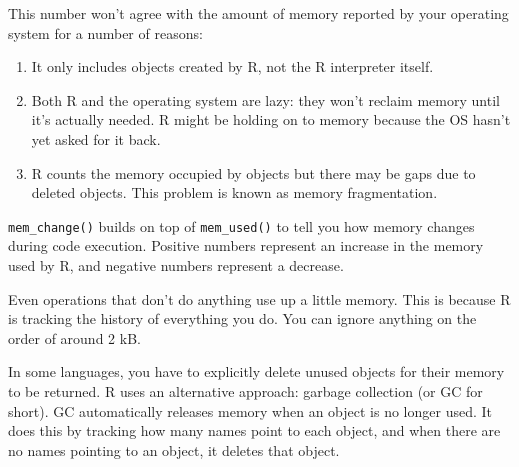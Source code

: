 This number won't agree with the amount of memory reported by your
operating system for a number of reasons:

\begin{enumerate}
\def\labelenumi{\arabic{enumi}.}
\item
  It only includes objects created by R, not the R interpreter itself.
\item
  Both R and the operating system are lazy: they won't reclaim memory
  until it's actually needed. R might be holding on to memory because
  the OS hasn't yet asked for it back.
\item
  R counts the memory occupied by objects but there may be gaps due to
  deleted objects. This problem is known as memory fragmentation.
\end{enumerate}

\texttt{mem\_change()} builds on top of \texttt{mem\_used()} to tell you
how memory changes during code execution. Positive numbers represent an
increase in the memory used by R, and negative numbers represent a
decrease. 

\begin{Shaded}
\begin{Highlighting}[]
\StringTok{ }\NormalTok{:}\NormalTok{)}
\NormalTok{(}
\end{Highlighting}
\end{Shaded}

Even operations that don't do anything use up a little memory. This is
because R is tracking the history of everything you do. You can ignore
anything on the order of around 2 kB.

\begin{Shaded}
\begin{Highlighting}[]
\NormalTok{(}\NormalTok{)}
\NormalTok{(}\NormalTok{)}
\end{Highlighting}
\end{Shaded}

In some languages, you have to explicitly delete unused objects for
their memory to be returned. R uses an alternative approach: garbage
collection (or GC for short). GC automatically releases memory when an
object is no longer used. It does this by tracking how many names point
to each object, and when there are no names pointing to an object, it
deletes that object. 

